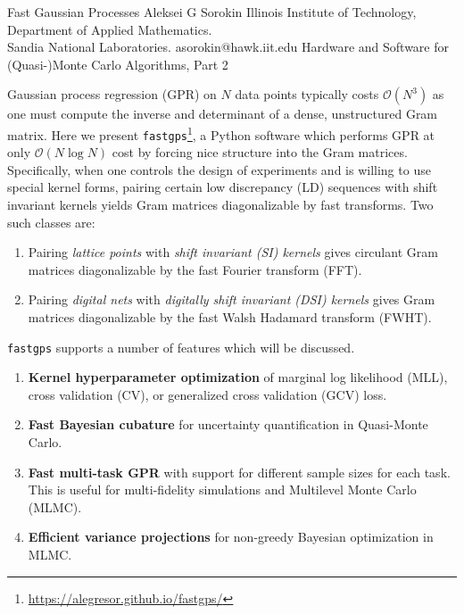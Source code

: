 \begin{talk}
  {Fast Gaussian Processes}%
  {Aleksei G Sorokin}%
  {Illinois Institute of Technology, Department of Applied Mathematics. \\ Sandia National Laboratories.}%
  {asorokin@hawk.iit.edu}%
  {}%
  {Hardware and Software for (Quasi-)Monte Carlo Algorithms, Part 2}%
    

        Gaussian process regression (GPR) on $N$ data points typically costs $\mathcal{O}(N^3)$ as one must compute the inverse and determinant of a dense, unstructured Gram matrix. Here we present \texttt{fastgps}\footnote{\url{https://alegresor.github.io/fastgps/}}, a Python software which performs GPR at only $\mathcal{O}(N \log N)$ cost by forcing nice structure into the Gram matrices. Specifically, when one controls the design of experiments and is willing to use special kernel forms, pairing certain low discrepancy (LD) sequences with shift invariant kernels yields Gram matrices diagonalizable by fast transforms. Two such classes are:
        \begin{enumerate}
          \item Pairing \emph{lattice points} with \emph{shift invariant (SI) kernels} gives circulant Gram matrices diagonalizable by the fast Fourier transform (FFT). 
          \item Pairing \emph{digital nets} with \emph{digitally shift invariant (DSI) kernels} gives Gram matrices diagonalizable by the fast Walsh Hadamard transform (FWHT). 
        \end{enumerate}
        \texttt{fastgps} supports a number of features which will be discussed. 
        \begin{enumerate}
          \item \textbf{Kernel hyperparameter optimization} of marginal log likelihood (MLL), cross validation (CV), or generalized cross validation (GCV) loss.
          \item \textbf{Fast Bayesian cubature} for uncertainty quantification in Quasi-Monte Carlo. 
          \item \textbf{Fast multi-task GPR} with support for different sample sizes for each task. This is useful for multi-fidelity simulations and Multilevel Monte Carlo (MLMC). 
          \item \textbf{Efficient variance projections} for non-greedy Bayesian optimization in MLMC.

\end{enumerate}
\end{talk}
